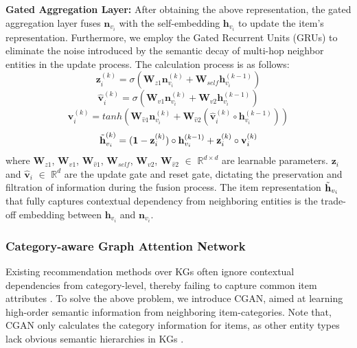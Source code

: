 \documentclass[conference]{IEEEtran}
\begin{document}
\textbf{Gated Aggregation Layer:}  After obtaining the above representation,  the gated aggregation layer fuses $\textbf{n}_{v_i}$ with the self-embedding $\textbf{h}_{v_i}$ to update the item's representation.  Furthermore, we employ the Gated Recurrent Units (GRUs) to eliminate the noise introduced by the semantic decay of multi-hop neighbor entities in the update process. The calculation process is as follows:
\begin{equation}
 \textbf{z}_{i}^{(k)} = \sigma ( \textbf{W}_{z1}  \textbf{n}_{v_i}^{(k)} + \textbf{W}_{self}\textbf{h}_{v_i}^{(k-1)})
\end{equation}
\begin{equation}
\hat{\textbf{v}}_{i}^{(k)} = \sigma ( \textbf{W}_{v1}  \textbf{n}_{v_i}^{(k)} + \textbf{W}_{v2}\textbf{h}_{v_i}^{(k-1)} )
\end{equation}
\begin{equation}
 \textbf{v}_{i}^{(k)}  = tanh ( \textbf{W}_{\hat{v}1}  \textbf{n}_{v_i}^{(k)} + \textbf{W}_{\hat{v}2}( \hat{\textbf{v}}_{i}^{(k)}  \circ \textbf{h}_{v_i}^{(k-1)})) 
\end{equation}
\begin{equation}
\Tilde{\textbf{h}}_{v_i}^{(k)} = (\textbf{1}- \textbf{z}_{i}^{(k)})\circ  \textbf{h}_{v_i}^{(k-1)} +  \textbf{z}_{i}^{(k)}\circ \textbf{v}_{i}^{(k)}  
\end{equation}
where $\textbf{W}_{z1}$, $\textbf{W}_{v1}$, $\textbf{W}_{\hat{v}1}$, $\textbf{W}_{self}$, $\textbf{W}_{v2}$, $\textbf{W}_{\hat{v}2}$ $\in$ $\mathbb{R}^{d \times d}$ are learnable parameters. $\textbf{z}_{i}$ and $\hat{\textbf{v}}_{i}$ $\in$ $\mathbb{R}^{d}$ are the update gate and reset gate, dictating the preservation and filtration of information during the fusion process. The item  representation $\Tilde{\textbf{h}}_{v_i}$ that fully captures contextual dependency from neighboring
entities is the trade-off embedding between $\textbf{h}_{v_i}$ and $\textbf{n}_{v_i}$. %




\subsubsection{Category-aware Graph Attention Network}
Existing recommendation methods over KGs often ignore contextual dependencies from category-level, thereby failing to capture common item attributes \cite{category01}. To solve the above problem, we introduce CGAN,  aimed at learning high-order semantic information from neighboring item-categories. Note that, CGAN only calculates the category information for items, as other entity types lack obvious semantic hierarchies in KGs \cite{KGRSsurveyrw}. 
\end{document}
